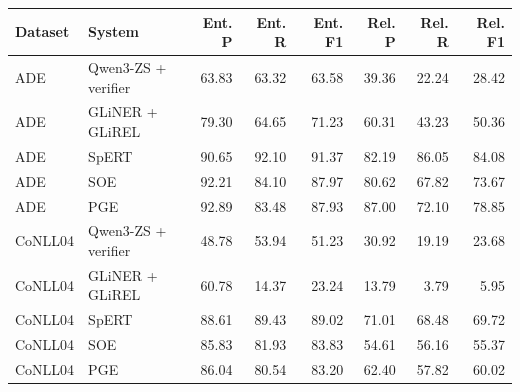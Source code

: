 \begin{tabular}{llrrrrrr}
\toprule
Dataset & System & Ent. P & Ent. R & Ent. F1 & Rel. P & Rel. R & Rel. F1 \\
\midrule
ADE & Qwen3-ZS + verifier & 63.83 & 63.32 & 63.58 & 39.36 & 22.24 & 28.42 \\
ADE & GLiNER + GLiREL & 79.30 & 64.65 & 71.23 & 60.31 & 43.23 & 50.36 \\
ADE & SpERT & 90.65 & 92.10 & 91.37 & 82.19 & 86.05 & 84.08 \\
ADE & SOE & 92.21 & 84.10 & 87.97 & 80.62 & 67.82 & 73.67 \\
ADE & PGE & 92.89 & 83.48 & 87.93 & 87.00 & 72.10 & 78.85 \\
CoNLL04 & Qwen3-ZS + verifier & 48.78 & 53.94 & 51.23 & 30.92 & 19.19 & 23.68 \\
CoNLL04 & GLiNER + GLiREL & 60.78 & 14.37 & 23.24 & 13.79 & 3.79 & 5.95 \\
CoNLL04 & SpERT & 88.61 & 89.43 & 89.02 & 71.01 & 68.48 & 69.72 \\
CoNLL04 & SOE & 85.83 & 81.93 & 83.83 & 54.61 & 56.16 & 55.37 \\
CoNLL04 & PGE & 86.04 & 80.54 & 83.20 & 62.40 & 57.82 & 60.02 \\
\bottomrule
\end{tabular}
